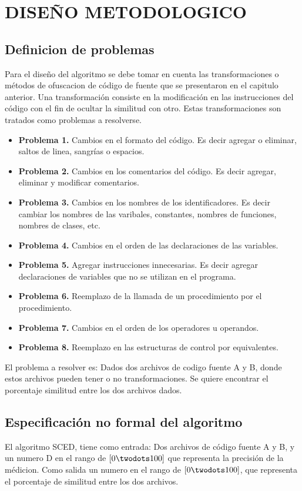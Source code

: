 \chapter{DISEÑO METODOLOGICO}

\section{Definicion de problemas}
Para el diseño del algoritmo se debe tomar en cuenta las transformaciones o métodos de ofuscacion de código de fuente que se presentaron en el capitulo anterior. Una transformación consiste en la modificación en las instrucciones del código con el fin de ocultar la similitud con otro. Estas transformaciones son tratados como problemas a resolverse.

\begin{itemize}
  \item[] \textbf{Problema 1.} Cambios en el formato del código. Es decir agregar o eliminar, saltos de linea, sangrías o espacios.
  \item[] \textbf{Problema 2.} Cambios en los comentarios del código. Es decir agregar, eliminar y modificar comentarios.
  \item[] \textbf{Problema 3.} Cambios en los nombres de los identificadores. Es decir cambiar los nombres de las varibales, constantes, nombres de funciones, nombres de clases, etc.
  \item[] \textbf{Problema 4.} Cambios en el orden de las declaraciones de las variables.
  \item[] \textbf{Problema 5.} Agregar instrucciones innecesarias. Es decir agregar declaraciones de variables que no se utilizan en el programa.
  \item[] \textbf{Problema 6.} Reemplazo de la llamada de un procedimiento por el procedimiento.
  \item[] \textbf{Problema 7.} Cambios en el orden de los operadores u operandos.
  \item[] \textbf{Problema 8.} Reemplazo en las estructuras de control por equivalentes.
\end{itemize}

El problema a resolver es: Dados dos archivos de codigo fuente A y B, donde estos archivos pueden tener o no transformaciones. Se quiere encontrar el porcentaje similitud entre los dos archivos dados.

\section{Especificación no formal del algoritmo}
El algoritmo SCED, tiene como entrada: Dos archivos de código fuente A y B, y un numero D en el rango de $[0 \twodots 100]$ que representa la precisión de la médicion. Como salida un numero en el rango de $[0 \twodots 100]$, que representa el porcentaje de similitud entre los dos archivos.

